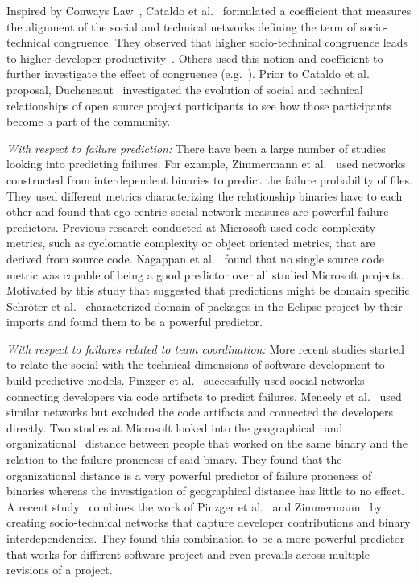 \documentclass[12pt,oneside]{book}
\begin{document}
Inspired by Conways Law~\cite{conway:datamination:1968}, Cataldo et
al.~\cite{cataldo:cscw:2006,cataldo:esem:2008} formulated a coefficient that
measures the alignment of the social and technical networks defining the term of
socio-technical congruence. They observed that higher socio-technical congruence
leads to higher developer
productivity~\cite{cataldo:cscw:2006,cataldo:esem:2008}. Others used this
notion and coefficient to further investigate the effect of congruence
(e.g.~\cite{valetto:msr:2007}). Prior to Cataldo et
al.~\cite{cataldo:cscw:2006,cataldo:esem:2008} proposal,
Ducheneaut~\cite{ducheneaut:cscw:2005} investigated the evolution of social and
technical relationships of open source project participants to see how those
participants become a part of the community.


\emph{With respect to failure prediction:}
There have been a large number of studies looking into predicting failures. For
example, Zimmermann et al.~\cite{zimmermann:icse:2008} used
networks constructed from interdependent binaries to predict the failure
probability of files. They used different metrics characterizing the relationship
binaries have to each other and found that ego centric social network measures
are powerful failure predictors. Previous research conducted at Microsoft used
code complexity metrics, such as cyclomatic complexity or object oriented
metrics, that are derived from source code. Nagappan et
al.~\cite{nagappan:icse:2006} found
that no single source code metric was capable of being a good
predictor over all studied Microsoft projects. Motivated by this study that
suggested that predictions might be domain specific Schr\"oter et
al.~\cite{schroeter:isese:2006} characterized domain of packages in the Eclipse
project by their imports and found them to be a powerful predictor.


\emph{With respect to failures related to team coordination:}
More recent studies started to relate the social with the technical
dimensions of software development to build predictive models. Pinzger et
al.~\cite{pinzger:fse:2008} successfully used social networks connecting
developers via code artifacts to predict failures. Meneely et
al.~\cite{meneely:fse:2008} used similar networks but excluded the code artifacts
and connected the developers directly. Two studies at Microsoft looked into the
geographical~\cite{bird:acm:2009} and organizational~\cite{nagappan:icse:2008}
distance between people that worked on the same binary and the relation to the
failure proneness of said binary. They found that the organizational distance is
a very powerful predictor of failure proneness of binaries whereas the
investigation of geographical distance has little to no effect. A recent
study~\cite{bird:issre:2009} combines the work of Pinzger et
al.~\cite{pinzger:fse:2008} and
Zimmermann~\cite{zimmermann:icse:2008} by creating
socio-technical networks that capture developer contributions and binary
interdependencies. They found this combination to be a more powerful predictor
that works for different software project and even prevails across multiple
revisions of a project.
\end{document}
